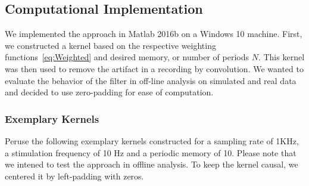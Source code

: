 \documentclass[a4paper]{article}
\begin{document}
\subsection{Computational Implementation}

We implemented the approach in Matlab 2016b on a Windows 10 machine. First, we constructed a kernel based on the respective weighting functions~\eqref{eq:Weighted} and desired memory, or number of periods $N$. This kernel was then used to remove the artifact in a recording by convolution.
We wanted to evaluate the behavior of the filter in off-line analysis on simulated and real data and decided to use zero-padding for ease of computation.

\subsubsection{Exemplary Kernels}
Peruse the following exemplary kernels constructed for a sampling rate of 1KHz, a stimulation frequency of 10 Hz and a periodic memory of 10.  Please note that we intened to test the approach in offline analysis. To keep the kernel causal, we centered it by left-padding with zeros.
\end{document}

